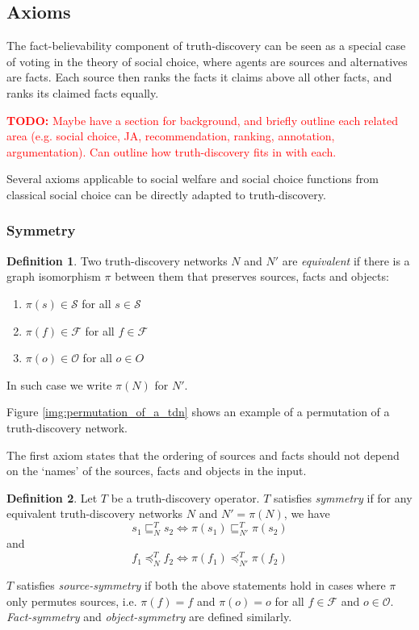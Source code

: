 \documentclass{article}
\theoremstyle{definition} \newtheorem{definition}{Definition}
\theoremstyle{definition} \newtheorem{example}{Example}
\theoremstyle{plain} \newtheorem{axiom}{Axiom}
\theoremstyle{plain} \newtheorem*{remark}{Remark}
\theoremstyle{remark} \newtheorem*{notation}{Notation}
\theoremstyle{plain} \newtheorem{lemma}{Lemma}
\theoremstyle{plain} \newtheorem{theorem}{Theorem}
\theoremstyle{plain} \newtheorem{proposition}{Proposition}
\newcommand{\todo}[1] {
    \textcolor{red}{
        \textbf{TODO:} #1
    }
}
\renewcommand{\S}{\mathcal{S}}  %
\renewcommand{\O}{\mathcal{O}}  %
\newcommand{\F}{\mathcal{F}}
\newcommand{\sle}{\sqsubseteq}
\newcommand{\fle}{\preceq}
\begin{document}
\subsection{Axioms}
\label{sec:axioms}

The fact-believability component of truth-discovery can be seen as a special
case of voting in the theory of social choice, where agents are sources and
alternatives are facts. Each source then ranks the facts it claims above all
other facts, and ranks its claimed facts equally.\footnotemark

\todo{
    Maybe have a section for background, and briefly outline each related area
    (e.g. social choice, JA, recommendation, ranking, annotation,
    argumentation). Can outline how truth-discovery fits in with each.
}


Several axioms applicable to social welfare and social choice functions from
classical social choice can be directly adapted to truth-discovery.

\subsubsection{Symmetry}

\begin{definition}
Two truth-discovery networks $N$ and $N'$ are \emph{equivalent} if there is a
graph isomorphism $\pi$ between them that preserves sources, facts and objects:
\begin{enumerate}
\item $\pi(s) \in \S$ for all $s \in \S$
\item $\pi(f) \in \F$ for all $f \in \F$
\item $\pi(o) \in \O$ for all $o \in O$
\end{enumerate}

In such case we write $\pi(N)$ for $N'$.
\end{definition}

Figure \ref{img:permutation_of_a_tdn} shows an example of a permutation of a
truth-discovery network.

The first axiom states that the ordering of sources and facts should not depend
on the `names' of the sources, facts and objects in the input.

\begin{definition}
Let $T$ be a truth-discovery operator. $T$ satisfies \emph{symmetry} if for
any equivalent truth-discovery networks $N$ and $N' = \pi(N)$, we have
$$ s_1 \sle_N^T s_2 \iff \pi(s_1) \sle_{N'}^T \pi(s_2) $$
and
$$ f_1 \fle_N^T f_2 \iff \pi(f_1) \fle_{N'}^T \pi(f_2) $$

$T$ satisfies \emph{source-symmetry} if both the above statements hold in cases
where $\pi$ only permutes sources, i.e. $\pi(f)=f$ and $\pi(o)=o$ for all $f
\in \F$ and $o \in \O$. \emph{Fact-symmetry} and \emph{object-symmetry} are
defined similarly.
\end{definition}
\end{document}
